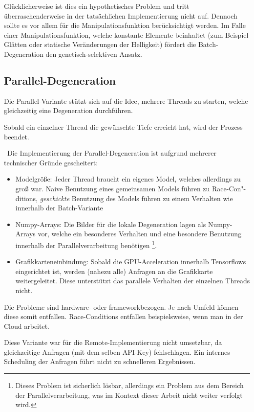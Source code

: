 Glücklicherweise ist dies ein hypothetisches Problem und tritt überraschenderweise in der tatsächlichen Implementierung nicht auf. 
Dennoch sollte es vor allem für die Manipulationsfunktion berücksichtigt werden. 
Im Falle einer Manipulationsfunktion, welche konstante Elemente beinhaltet (zum Beispiel Glätten oder statische Veränderungen der Helligkeit) fördert die Batch-Degeneration den genetisch-selektiven Ansatz.
\newpage
\subsection{Parallel-Degeneration}
Die Parallel-Variante stützt sich auf die Idee, mehrere Threads zu starten, welche gleichzeitig eine Degeneration durchführen.

Sobald ein einzelner Thread die gewünschte Tiefe erreicht hat, wird der Prozess beendet. 

~\newline Die Implementierung der Parallel-Degeneration ist aufgrund mehrerer technischer Gründe gescheitert: 

\begin{itemize}
	\item Modelgröße: Jeder Thread braucht ein eigenes Model, welches allerdings zu groß war. 
	Naive Benutzung eines gemeinsamen Models führen zu Race-Con"-ditions, \textit{geschickte} Benutzung des Models führen zu einem Verhalten wie innerhalb der Batch-Variante
	\item Numpy-Arrays: Die Bilder für die lokale Degeneration lagen als Numpy-Arrays vor, welche ein besonderes Verhalten und eine besondere Benutzung innerhalb der Parallelverarbeitung benötigen \footnote{Dieses Problem ist sicherlich lösbar, allerdings ein Problem aus dem Bereich der Parallelverarbeitung, was im Kontext dieser Arbeit nicht weiter verfolgt wird.}. 
	\item Grafikkarteneinbindung: Sobald die GPU-Acceleration innerhalb Tensorflows eingerichtet ist, werden (nahezu alle) Anfragen an die Grafikkarte weitergeleitet. 
	Diese unterstützt das parallele Verhalten der einzelnen Threads nicht. 
\end{itemize} 

Die Probleme sind hardware- oder frameworkbezogen. 
Je nach Umfeld können diese somit entfallen. 
Race-Conditions entfallen beispielsweise, wenn man in der Cloud arbeitet.

Diese Variante war für die Remote-Implementierung nicht umsetzbar, da gleichzeitige Anfragen (mit dem selben API-Key) fehlschlagen. 
Ein internes Scheduling der Anfragen führt nicht zu schnelleren Ergebnissen. 
\newpage

